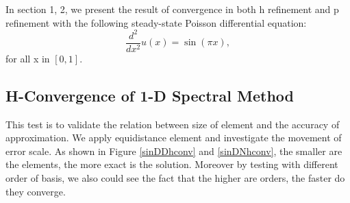 In section 1, 2, we present the result of convergence in both h
refinement and p refinement with the following steady-state
Poisson differential equation:
\begin{equation*}
    \frac{d^2}{dx^2} u(x) = \sin(\pi x),
\end{equation*}
for all x in $[0, 1]$.


\subsection {H-Convergence of 1-D Spectral Method}

This test is to validate the relation between size of element and
the accuracy of approximation. We apply equidistance element and
investigate the movement of error scale. As shown in Figure
\ref{sinDDhconv} and \ref{sinDNhconv}, the smaller are the
elements, the more exact is the solution. Moreover by testing with
different order of basis, we also could see the fact that the
higher are orders, the faster do they converge.


